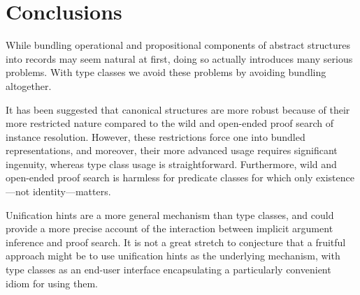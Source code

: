 \documentclass[a4paper,10pt,runningheads]{llncs}
\begin{document}
\section{Conclusions}\label{conclusions}

While bundling operational and propositional components of abstract structures into records may seem natural at first, doing so actually introduces many serious problems. With type classes we avoid these problems by avoiding bundling altogether.


It has been suggested that canonical structures are more robust because of their more restricted nature compared to the wild and open-ended proof search of instance resolution. However, these restrictions force one into bundled representations, and moreover, their more advanced usage requires significant ingenuity, whereas type class usage is straightforward. Furthermore, wild and open-ended proof search is harmless for predicate classes for which only existence---not identity---matters.


Unification hints are a more general mechanism than type classes, and could provide a more precise account of the interaction between implicit argument inference and proof search. It is not a great stretch to conjecture that a fruitful approach might be to use unification hints as the underlying mechanism, with type classes as an end-user interface encapsulating a particularly convenient idiom for using them.
\end{document}
